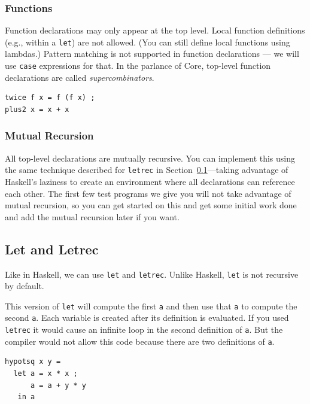 \documentclass[11pt]{article}
\begin{document}
\subsubsection{Functions}
\label{sec:org45509a5}

Function declarations may only appear at the top level. Local function definitions (e.g., within a \texttt{let}) are not
allowed.  (You can still define local functions using lambdas.)  Pattern matching is not supported in function
declarations --- we will use \texttt{case} expressions for that.  In the parlance of Core, top-level function declarations are
called \emph{supercombinators}.

\begin{verbatim}
twice f x = f (f x) ;
plus2 x = x + x
\end{verbatim}
\subsubsection{Mutual Recursion}
\label{sec:org9a21ca5}

All top-level declarations are mutually recursive.  You can implement this using the same technique described for \texttt{letrec}
in Section~\ref{sec:org7e6ee98}---taking advantage of Haskell's laziness to create an environment where all declarations
can reference each other.  The first few test programs we give you will not take advantage of mutual recursion, so you can
get started on this and get some initial work done and add the mutual recursion later if you want.
\subsection{Let and Letrec}
\label{sec:org7e6ee98}

Like in Haskell, we can use \texttt{let} and \texttt{letrec}.  Unlike Haskell, \texttt{let} is not recursive by default.

This version of \texttt{let} will compute the first \texttt{a} and then use that \texttt{a} to compute the second \texttt{a}.  Each variable is created after
its definition is evaluated.  If you used \texttt{letrec} it would cause an infinite loop in the second definition of \texttt{a}.  But the compiler
would not allow this code because there are two definitions of \texttt{a}.

\begin{verbatim}
hypotsq x y =
  let a = x * x ;
      a = a + y * y
   in a
\end{verbatim}
\end{document}
